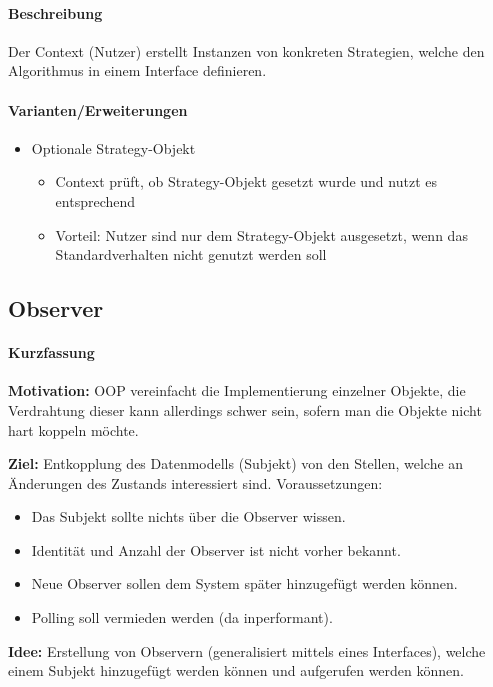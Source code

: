 			\paragraph{Beschreibung}
				Der Context (Nutzer) erstellt Instanzen von konkreten Strategien, welche den Algorithmus in einem Interface definieren.
			
			\paragraph{Varianten/Erweiterungen}
				\begin{itemize}
					\item Optionale Strategy-Objekt
						\begin{itemize}
							\item Context prüft, ob Strategy-Objekt gesetzt wurde und nutzt es entsprechend
							\item Vorteil: Nutzer sind nur dem Strategy-Objekt ausgesetzt, wenn das Standardverhalten nicht genutzt werden soll
						\end{itemize}
				\end{itemize}
		
		\subsection{Observer}
			\paragraph{Kurzfassung}
				\textbf{Motivation:} OOP vereinfacht die Implementierung einzelner Objekte, die Verdrahtung dieser kann allerdings schwer sein, sofern man die Objekte nicht hart koppeln möchte.
				
				\textbf{Ziel:} Entkopplung des Datenmodells (Subjekt) von den Stellen, welche an Änderungen des Zustands interessiert sind. Voraussetzungen:
				\begin{itemize}
					\item Das Subjekt sollte nichts über die Observer wissen.
					\item Identität und Anzahl der Observer ist nicht vorher bekannt.
					\item Neue Observer sollen dem System später hinzugefügt werden können.
					\item Polling soll vermieden werden (da inperformant).
				\end{itemize}
				
				\textbf{Idee:} Erstellung von Observern (generalisiert mittels eines Interfaces), welche einem Subjekt hinzugefügt werden können und aufgerufen werden können.
				
